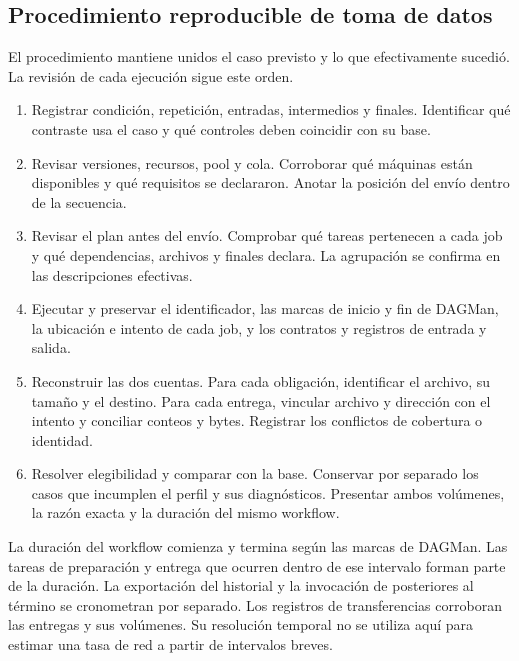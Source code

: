 \subsection{Procedimiento reproducible de toma de datos}
\label{sec:protocolo_a}
El procedimiento mantiene unidos el caso previsto y lo que efectivamente sucedió. La revisión de cada ejecución sigue este orden.
\begin{enumerate}
\item Registrar condición, repetición, entradas, intermedios y finales. Identificar qué contraste usa el caso y qué controles deben coincidir con su base.
\item Revisar versiones, recursos, pool y cola. Corroborar qué máquinas están disponibles y qué requisitos se declararon. Anotar la posición del envío dentro de la secuencia.
\item Revisar el plan antes del envío. Comprobar qué tareas pertenecen a cada job y qué dependencias, archivos y finales declara. La agrupación se confirma en las descripciones efectivas.
\item Ejecutar y preservar el identificador, las marcas de inicio y fin de DAGMan, la ubicación e intento de cada job, y los contratos y registros de entrada y salida.
\item Reconstruir las dos cuentas. Para cada obligación, identificar el archivo, su tamaño y el destino. Para cada entrega, vincular archivo y dirección con el intento y conciliar conteos y bytes. Registrar los conflictos de cobertura o identidad.
\item Resolver elegibilidad y comparar con la base. Conservar por separado los casos que incumplen el perfil y sus diagnósticos. Presentar ambos volúmenes, la razón exacta y la duración del mismo workflow.
\end{enumerate}

La duración del workflow comienza y termina según las marcas de DAGMan. Las tareas de preparación y entrega que ocurren dentro de ese intervalo forman parte de la duración. La exportación del historial y la invocación de \Analyzer{} posteriores al término se cronometran por separado. Los registros de transferencias corroboran las entregas y sus volúmenes. Su resolución temporal no se utiliza aquí para estimar una tasa de red a partir de intervalos breves.

